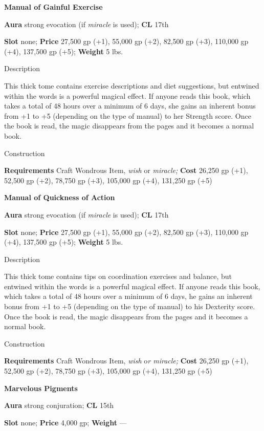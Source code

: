 \textbf{Manual of Gainful Exercise}
				
\textbf{Aura} strong evocation (if \textit{miracle} is used);\textbf{ CL }17th
				
\textbf{Slot} none; \textbf{Price} 27,500 gp (+1), 55,000 gp (+2), 82,500 gp (+3), 110,000 gp (+4), 137,500 gp (+5); \textbf{Weight} 5 lbs.
				
Description
				
This thick tome contains exercise descriptions and diet suggestions, but entwined within the words is a powerful magical effect. If anyone reads this book, which takes a total of 48 hours over a minimum of 6 days, she gains an inherent bonus from +1 to +5 (depending on the type of manual) to her Strength score. Once the book is read, the magic disappears from the pages and it becomes a normal book. 
				
Construction
				
\textbf{Requirements} Craft Wondrous Item,\textit{ wish }or\textit{ miracle; }\textbf{Cost }26,250 gp (+1), 52,500 gp (+2), 78,750 gp (+3), 105,000 gp (+4), 131,250 gp (+5)
				
\textbf{Manual of Quickness of Action}
				
\textbf{Aura} strong evocation (if \textit{miracle} is used);\textbf{ CL }17th
				
\textbf{Slot} none; \textbf{Price} 27,500 gp (+1), 55,000 gp (+2), 82,500 gp (+3), 110,000 gp (+4), 137,500 gp (+5); \textbf{Weight} 5 lbs.
				
Description
				
This thick tome contains tips on coordination exercises and balance, but entwined within the words is a powerful magical effect. If anyone reads this book, which takes a total of 48 hours over a minimum of 6 days, he gains an inherent bonus from +1 to +5 (depending on the type of manual) to his Dexterity score. Once the book is read, the magic disappears from the pages and it becomes a normal book. 
				
Construction
				
\textbf{Requirements} Craft Wondrous Item,\textit{ wish }o\textit{r miracle; }\textbf{Cost }26,250 gp (+1), 52,500 gp (+2), 78,750 gp (+3), 105,000 gp (+4), 131,250 gp (+5)
				
\textbf{Marvelous Pigments}
				
\textbf{Aura} strong conjuration;\textbf{ CL }15th
				
\textbf{Slot} none; \textbf{Price} 4,000 gp; \textbf{Weight }---
				
